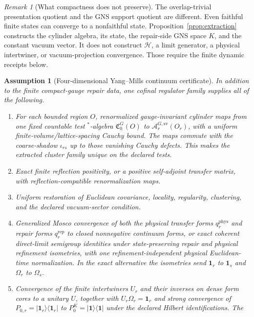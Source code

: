 \documentclass[11pt]{article}
\numberwithin{equation}{section}
\newtheorem{assumption}[theorem]{Assumption}
\theoremstyle{remark}
\newtheorem{remark}[theorem]{Remark}
\newcommand{\Hcal}{\mathcal H}
\begin{document}
\begin{remark}[What compactness does not preserve]
The overlap-trivial presentation quotient and the GNS support quotient are different. Even
faithful finite states can converge to a nonfaithful state. Proposition~\ref{prop:extraction}
constructs the cylinder algebra, its state, the repair-side GNS space \(K\), and the constant
vacuum vector. It does not construct \(\Hcal\), a limit generator, a physical intertwiner, or
vacuum-projection convergence. Those require the finite dynamic receipts below.
\end{remark}

\begin{assumption}[Four-dimensional Yang--Mills continuum certificate]
\label{ass:ym-continuum-certificate}
In addition to the finite compact-gauge repair data, one cofinal regulator family supplies all of
the following.
\begin{enumerate}[label=\textup{(Y\arabic*)},leftmargin=2em]
\item For each bounded region \(O\), renormalized gauge-invariant cylinder maps from one fixed
countable test \(^*\)-algebra \(\mathfrak C_0^G(O)\) to
\(\mathcal A_r^{G,\mathrm{sv}}(O_r)\), with a uniform finite-volume/lattice-spacing Cauchy bound.
The maps commute with the coarse-shadow \(\iota_{rs}\) up to those vanishing Cauchy defects. This
makes the extracted cluster family unique on the declared tests.
\item Exact finite reflection positivity, or a positive self-adjoint transfer matrix, with
reflection-compatible renormalization maps.
\item Uniform restoration of Euclidean covariance, locality, regularity, clustering, and the
declared vacuum-sector condition.
\item Generalized Mosco convergence of both the physical transfer forms
\(q_r^{\mathrm{phys}}\) and repair forms \(q_r^{\mathrm{rep}}\) to closed nonnegative continuum
forms, or exact coherent direct-limit semigroup identities under state-preserving repair and
physical refinement isometries, with one refinement-independent physical Euclidean-time
normalization. In the exact alternative the isometries send \(\mathbf 1_r\) to \(\mathbf 1_s\)
and \(\Omega_r\) to \(\Omega_s\).
\item Convergence of the finite intertwiners \(U_r\) and their inverses on dense form cores to a
unitary \(U\), together with
\(U_r\Omega_r=\mathbf 1_r\) and strong convergence of
\(P_{0,r}=|\mathbf 1_r\rangle\langle\mathbf 1_r|\) to
\(P_0^K=|\mathbf 1\rangle\langle\mathbf 1|\) under the declared Hilbert identifications. The

\end{enumerate}
\end{assumption}
\end{document}
